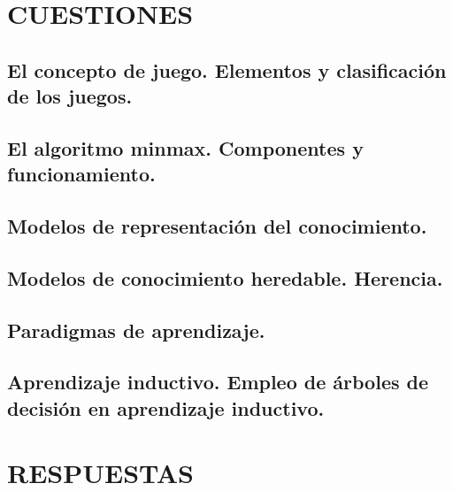 \section{CUESTIONES}
\subsection{El concepto de juego. Elementos y clasificación de los juegos.}
\subsection{El algoritmo minmax. Componentes y funcionamiento.}
\subsection{Modelos de representación del conocimiento.}
\subsection{Modelos de conocimiento heredable. Herencia.}
\subsection{Paradigmas de aprendizaje.}
\subsection{Aprendizaje inductivo. Empleo de árboles de decisión en aprendizaje inductivo.}
\pagebreak
\section{RESPUESTAS}

